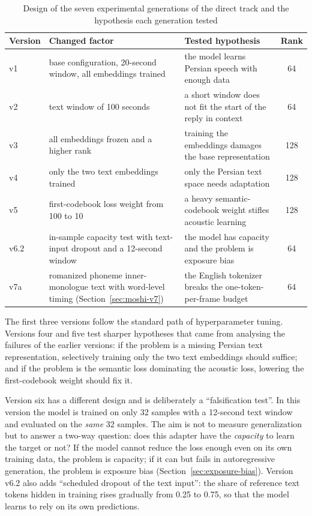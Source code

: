 \begin{table}[ht]
\centering
\caption{Design of the seven experimental generations of the direct track and the
         hypothesis each generation tested}
\label{tab:moshi-design}
\small
\begin{tabular}{lL{3.6cm}L{4.8cm}c}
\toprule
\textbf{Version} & \textbf{Changed factor} & \textbf{Tested hypothesis} &
\textbf{Rank} \\
\midrule
v1 & base configuration, 20-second window, all embeddings trained &
the model learns Persian speech with enough data & 64 \\
v2 & text window of 100 seconds &
a short window does not fit the start of the reply in context & 64 \\
v3 & all embeddings frozen and a higher rank &
training the embeddings damages the base representation & 128 \\
v4 & only the two text embeddings trained &
only the Persian text space needs adaptation & 128 \\
v5 & first-codebook loss weight from 100 to 10 &
a heavy semantic-codebook weight stifles acoustic learning & 128 \\
v6.2 & in-sample capacity test with text-input dropout and a 12-second window &
the model has capacity and the problem is exposure bias & 64 \\
v7a & romanized phoneme inner-monologue text with word-level timing
(Section~\ref{sec:moshi-v7}) &
the English tokenizer breaks the one-token-per-frame budget & 64 \\
\bottomrule
\end{tabular}
\end{table}

The first three versions follow the standard path of hyperparameter tuning. Versions four
and five test sharper hypotheses that came from analysing the failures of the earlier
versions: if the problem is a missing Persian text representation, selectively training
only the two text embeddings should suffice; and if the problem is the semantic loss
dominating the acoustic loss, lowering the first-codebook weight should fix it.

Version six has a different design and is deliberately a ``falsification test''. In this
version the model is trained on only 32 samples with a 12-second text window and
evaluated on the \emph{same} 32 samples. The aim is not to measure generalization but to
answer a two-way question: does this adapter have the \emph{capacity} to learn the target
or not? If the model cannot reduce the loss enough even on its own training data, the
problem is capacity; if it can but fails in autoregressive generation, the problem is
exposure bias (Section~\ref{sec:exposure-bias}). Version v6.2 also adds ``scheduled
dropout of the text input'': the share of reference text tokens hidden in training rises
gradually from 0.25 to 0.75, so that the model learns to rely on its own predictions.

